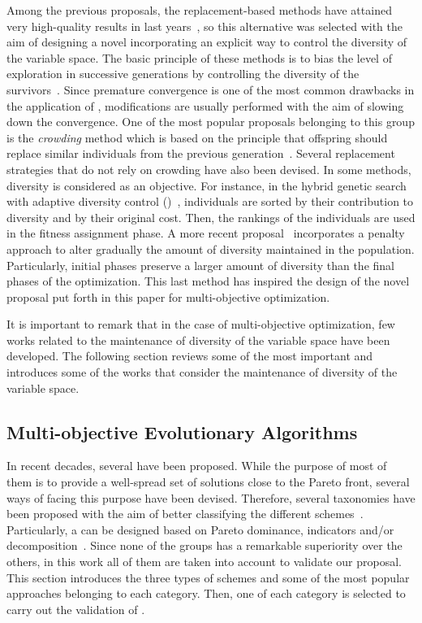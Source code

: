 Among the previous proposals, the replacement-based methods have attained very high-quality results in last years~\cite{Segura:17}, so
this alternative was selected with the aim of designing a novel \MOEA{} incorporating an explicit way to control the diversity 
of the variable space.
%
The basic principle of these methods is to bias the level of exploration in successive generations by 
controlling the diversity of the survivors~\cite{Segura:17}.
%
Since premature convergence is one of the most common drawbacks in the application of \EAS{}, 
modifications are usually performed with the aim of slowing down the convergence.
%
One of the most popular proposals belonging to this group is the \textit{crowding} method which
is based on the principle that offspring should replace similar individuals from the previous generation~\cite{Mengshoel:14}.
%
Several replacement strategies that do not rely on crowding have also been devised.
%
In some methods, diversity is considered as an objective.
%
For instance, in the hybrid genetic search with adaptive diversity control (\HGSADC{})~\cite{Vidal:13}, individuals are sorted 
by their contribution to diversity and by their original cost.
%
Then, the rankings of the individuals are used in the fitness assignment phase.
%
A more recent proposal~\cite{Segura:17} incorporates a penalty approach to alter gradually the amount of diversity 
maintained in the population.
%
Particularly, initial phases preserve a larger amount of diversity than the final phases of the optimization.
%
This last method has inspired the design of the novel proposal put forth in this paper for multi-objective optimization.
%

It is important to remark that in the case of multi-objective optimization, few works related to the maintenance of 
diversity of the variable space have been developed.
%
The following section reviews some of the most important \MOEAS{} and introduces some of the works that consider
the maintenance of diversity of the variable space.

\subsection{Multi-objective Evolutionary Algorithms}

In recent decades, several \MOEAS{} have been proposed. 
%
While the purpose of most of them is to provide a well-spread set of solutions close to the Pareto front,
several ways of facing this purpose have been devised.
%
Therefore, several taxonomies have been proposed with the aim of better classifying the different 
schemes~\cite{Joel:BOOK_MOEAs}.
%
Particularly, a \MOEA{} can be designed based on Pareto dominance, indicators and/or decomposition~\cite{Joel:StateArt}.
%
Since none of the groups has a remarkable superiority over the others, in this work all of them are taken into account to validate
our proposal.
%
This section introduces the three types of schemes and some of the most popular approaches belonging to each category.
%
Then, one \MOEA{} of each category is selected to carry out the validation of \VSDMOEA{}.

